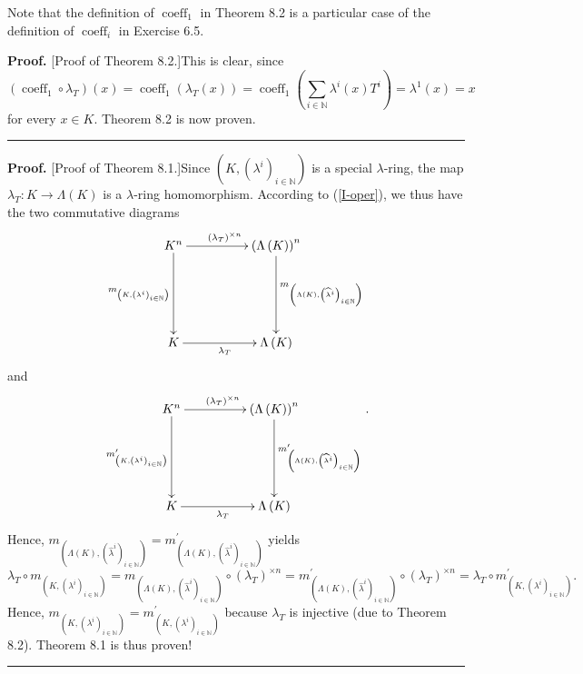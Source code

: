 \documentclass[numbers=enddot,12pt,final,onecolumn,notitlepage]{scrartcl}%
\newenvironment{proof}[1][Proof]{\noindent\textbf{#1.} }{\ \rule{0.5em}{0.5em}}
\begin{document}
Note that the definition of $\operatorname*{coeff}\nolimits_{1}$ in Theorem
8.2 is a particular case of the definition of $\operatorname*{coeff}%
\nolimits_{i}$ in Exercise 6.5.

\begin{proof}
[Proof of Theorem 8.2.]This is clear, since
\[
\left(  \operatorname*{coeff}\nolimits_{1}\circ\lambda_{T}\right)  \left(
x\right)  =\operatorname*{coeff}\nolimits_{1}\left(  \lambda_{T}\left(
x\right)  \right)  =\operatorname*{coeff}\nolimits_{1}\left(  \sum
\limits_{i\in\mathbb{N}}\lambda^{i}\left(  x\right)  T^{i}\right)
=\lambda^{1}\left(  x\right)  =x
\]
for every $x\in K$. Theorem 8.2 is now proven.
\end{proof}

\begin{proof}
[Proof of Theorem 8.1.]Since $\left(  K,\left(  \lambda^{i}\right)
_{i\in\mathbb{N}}\right)  $ is a special $\lambda$-ring, the map $\lambda
_{T}:K\rightarrow\Lambda\left(  K\right)  $ is a $\lambda$-ring homomorphism.
According to (\ref{I-oper}), we thus have the two commutative diagrams%
\[
\xymatrixrowsep{5pc}\xymatrixcolsep{4pc}\xymatrix{
K^n \ar[r]^{\left(\lambda_T\right)^{\times n}} \ar[d]_{m_{\left(K,\left(\lambda^i\right)_{i\in\mathbb{N}}\right)}} & \left(\Lambda\left(K\right)\right)^n \ar[d]^{m_{\left(\Lambda\left(K\right),\left(\widehat{\lambda}^i\right)_{i\in\mathbb{N}}\right)}} \\
K \ar[r]_{\lambda_T} & \Lambda\left(K\right)
}
\]
and%
\[
\xymatrixrowsep{5pc}\xymatrixcolsep{4pc}\xymatrix{
K^n \ar[r]^{\left(\lambda_T\right)^{\times n}} \ar[d]_{m^{\prime}_{\left(K,\left(\lambda^i\right)_{i\in\mathbb{N}}\right)}} & \left(\Lambda\left(K\right)\right)^n \ar[d]^{m^{\prime}_{\left(\Lambda\left(K\right),\left(\widehat{\lambda}^i\right)_{i\in\mathbb{N}}\right)}} \\
K \ar[r]_{\lambda_T} & \Lambda\left(K\right)
}.
\]
Hence, $m_{\left(  \Lambda\left(  K\right)  ,\left(  \widehat{\lambda}%
^{i}\right)  _{i\in\mathbb{N}}\right)  }=m_{\left(  \Lambda\left(  K\right)
,\left(  \widehat{\lambda}^{i}\right)  _{i\in\mathbb{N}}\right)  }^{\prime}$
yields%
\[
\lambda_{T}\circ m_{\left(  K,\left(  \lambda^{i}\right)  _{i\in\mathbb{N}%
}\right)  }=m_{\left(  \Lambda\left(  K\right)  ,\left(  \widehat{\lambda}%
^{i}\right)  _{i\in\mathbb{N}}\right)  }\circ\left(  \lambda_{T}\right)
^{\times n}=m_{\left(  \Lambda\left(  K\right)  ,\left(  \widehat{\lambda}%
^{i}\right)  _{i\in\mathbb{N}}\right)  }^{\prime}\circ\left(  \lambda
_{T}\right)  ^{\times n}=\lambda_{T}\circ m_{\left(  K,\left(  \lambda
^{i}\right)  _{i\in\mathbb{N}}\right)  }^{\prime}.
\]
Hence, $m_{\left(  K,\left(  \lambda^{i}\right)  _{i\in\mathbb{N}}\right)
}=m_{\left(  K,\left(  \lambda^{i}\right)  _{i\in\mathbb{N}}\right)  }%
^{\prime}$ because $\lambda_{T}$ is injective (due to Theorem 8.2). Theorem
8.1 is thus proven!
\end{proof}
\end{document}
